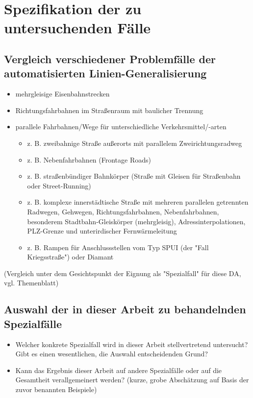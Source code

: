\chapter{Spezifikation der zu untersuchenden Fälle}

\section[Vergleich verschiedener Problemfälle]{Vergleich verschiedener Problemfälle der automatisierten Linien-Generalisierung}

\begin{itemize}
	\item mehrgleisige Eisenbahnstrecken
	\item Richtungsfahrbahnen im Straßenraum mit baulicher Trennung
	\item parallele Fahrbahnen/Wege für unterschiedliche Verkehrsmittel/-arten
	\begin{itemize}
		\item z. B. zweibahnige Straße außerorts mit parallelem Zweirichtungsradweg
		\item z. B. Nebenfahrbahnen (Frontage Roads)
		\item z. B. straßenbündiger Bahnkörper (Straße mit Gleisen für Straßenbahn oder Street-Running)
		\item z. B. komplexe innerstädtische Straße mit mehreren parallelen getrennten Radwegen, Gehwegen, Richtungsfahrbahnen, Nebenfahrbahnen, besonderem Stadtbahn-Gleiskörper (mehrgleisig), Adressinterpolationen, PLZ-Grenze und unterirdischer Fernwärmeleitung
		\item z. B. Rampen für Anschlussstellen vom Typ SPUI (der "Fall Kriegsstraße") oder Diamant
	\end{itemize}
\end{itemize}

(Vergleich unter dem Gesichtspunkt der Eignung als "Spezialfall" für diese DA, vgl. Themenblatt)


\section{Auswahl der in dieser Arbeit zu behandelnden Spezialfälle}

\begin{itemize}
	\item Welcher konkrete Spezialfall wird in dieser Arbeit stellvertretend untersucht? Gibt es einen wesentlichen, die Auswahl entscheidenden Grund?
	\item Kann das Ergebnis dieser Arbeit auf andere Spezialfälle oder auf die Gesamtheit verallgemeinert werden? (kurze, grobe Abschätzung auf Basis der zuvor benannten Beispiele)
\end{itemize}

